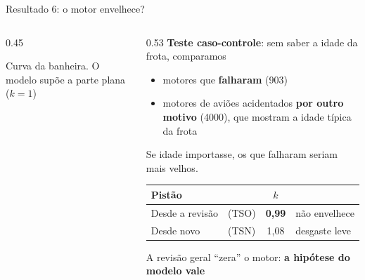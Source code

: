 \documentclass[aspectratio=169,11pt]{beamer}
\newcommand{\destaque}[1]{{\color{ieeeblue}\bfseries #1}}
\begin{document}
\begin{frame}{Resultado 6: o motor envelhece?}
  \begin{columns}[c]
    \begin{column}{0.45\textwidth}
      \centering
      \vspace{1mm}
      {\scriptsize\color{cinza}Curva da banheira. O modelo supõe a parte plana ($k=1$)\par}
    \end{column}
    \begin{column}{0.53\textwidth}
      \small
      \textbf{Teste caso-controle}: sem saber a idade da frota, comparamos
      \begin{itemize}
        \item motores que \textbf{falharam} (903)
        \item motores de aviões acidentados \textbf{por outro motivo} (4000), que mostram a idade típica da frota
      \end{itemize}
      Se idade importasse, os que falharam seriam mais velhos.
      \vspace{1mm}
      \begin{tabular}{@{}llcl@{}}
        \toprule
        Pistão & & $k$ & \\
        \midrule
        Desde a revisão & (TSO) & \destaque{0,99} & não envelhece \\
        Desde novo & (TSN) & 1,08 & desgaste leve \\
        \bottomrule
      \end{tabular}
      \vspace{1mm}
      {\footnotesize A revisão geral ``zera'' o motor: \textbf{a hipótese do modelo vale}\par}
    \end{column}
  \end{columns}
\end{frame}
\end{document}
